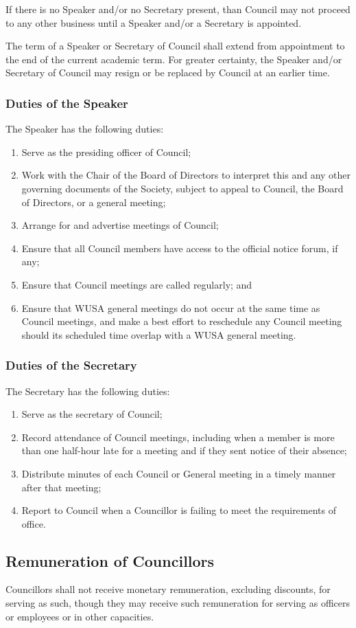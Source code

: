 If there is no Speaker and/or no Secretary present, than Council may
not proceed to any other business until a Speaker and/or a Secretary is
appointed. 

The term of a Speaker or Secretary of Council shall extend from 
appointment to the end of the current academic term. For greater certainty,
the Speaker and/or Secretary of Council may resign or be replaced by
Council at an earlier time. 

\subsubsection{Duties of the Speaker}
The Speaker has the following duties:
\begin{enumerate}
  \item Serve as the presiding officer of Council;
  \item Work with the Chair of the Board of Directors to interpret this and any
      other governing documents of the Society, subject to appeal to 
      Council, the Board of Directors, or a general meeting;
  \item Arrange for and advertise meetings of Council;
  \item Ensure that all Council members have access to the official
      notice forum, if any;
  \item Ensure that Council meetings are called regularly; and
  \item Ensure that WUSA general meetings do not occur at the same time as Council meetings, and make a best effort to reschedule any Council meeting should its scheduled time overlap with a WUSA general meeting.
\end{enumerate}

\subsubsection{Duties of the Secretary}
The Secretary has the following duties:
\begin{enumerate}
  \item Serve as the secretary of Council;
  \item Record attendance of Council meetings, including when a
      member is more than one half-hour late for a meeting and if they sent
      notice of their absence;
  \item Distribute minutes of each Council or General meeting in a
      timely manner after that meeting;
  \item Report to Council when a Councillor is failing to meet the
      requirements of office.
\end{enumerate}

\subsection{Remuneration of Councillors}

Councillors shall not receive monetary remuneration, excluding discounts, 
for serving as such, though they may receive such remuneration for serving 
as officers or employees or in other capacities.

